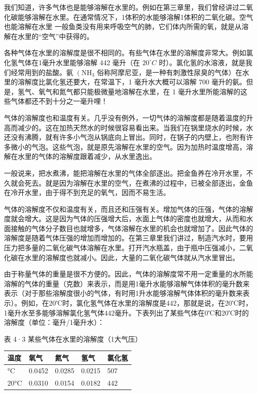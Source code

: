 我们知道，许多气体也是能够溶解在水里的。例如在第三章里，我们曾经讲过二氧化碳能够溶解在水里。在通常情况下，1体积的水能够溶解1体积的二氧化碳。空气也能溶解在水里
一般鱼类没有用来呼吸空气的肺，它们体内所需的氧，就是从溶解在水里的``空气''中获得的。

各种气体在水里的溶解度是很不相同的。有些气体在水里的溶解度非常大。例如氯化氢气体在1毫升水里能够溶解
442 毫升（在 \(20^{\circ}C\)
时）。氯化氢的水溶液，就是我们经常用到的盐酸。氨
\(\left(\mathrm{NH}_{3}\right.\)
俗称阿摩尼亚，是一种有刺激性尿臭的气体）在水里的溶解度比氯化氢还要大，在常温下，1
毫升水大概可以溶解 700
毫升的氨。但是，氢气、氧气和氮气都只能极微量地溶解在水里，在 1
毫升水里所能溶解的这些气体都还不到十分之一毫升哩！

气体的溶解度也和温度有关。几乎没有例外，一切气体的溶解度都是随着温度的升高而减少的。这在加热天然水的时候很容易看出来。当我们在锅里烧水的时候，水还没有沸腾，就有许多小气泡从锅底向上冒出。同时，在锅子的内壁上，也附有许多微小的气泡。这些气泡，就是原先溶解在水里的空气。因为加热时温度增高，溶解在水里的气体的溶解度跟着减少，从水里逸出。

一般说来，把水煮沸，能把溶解在水里的气体全部逐出。把金鱼养在冷开水里，不久就会死去。就是因为溶解在水里的空气，在煮沸的过程中，已被全部逐出，金鱼在冷开水里，由于得不到充足的氧气，因而不易生活。

气体的溶解度不仅和温度有关，而且还和压强有关。增加气体的压强，气体的溶解度就会增大。这是因为气体的压强增大后，水面上气体的密度也就增大，从而和水面接触的气体分子数目也就增多，气体溶解在水里的机会也就增加了。因此气体的溶解度是随着气体压强的增加而增加的。在第三章里我们讲过，制造汽水时，要用压力把多量的二氧化碳气体溶解在水里。打开汽水瓶盖，由于瓶中压强减小，二氧化碳在水里的溶解度也就减小。因此，大量的二氧化碳气体就从汽水里冒出。

由于称量气体的重量是很不方便的。因此，气体的溶解度常不用一定重量的水所能溶解的气体的重量（克数）来表示，而是用1毫升水能够溶解气体体积的毫升数来表示（对于那些溶解度很小的气体，有时用1升水能够溶解气体体积的毫升数来表示）。例如，在20℃时，氯化氢气体在水里的溶解度是442，那就是说，在20℃时，1毫升水至多能够溶解氯化氢气体442毫升。下表列出了某些气体在0℃和20℃时的溶解度（单位：毫升/1毫升水）：

表 4·3 某些气体在水里的溶解度（1大气压）

{\def\LTcaptype{none} %
\begin{longtable}[]{@{}lllll@{}}
\toprule\noalign{}
温度 & 氧气 & 氮气 & 氢气 & 氯化氢 \\
\midrule\noalign{}
\endhead
\bottomrule\noalign{}
\endlastfoot
0°C & 0.0452 & 0.0285 & 0.0215 & 507 \\
20°C & 0.0310 & 0.0154 & 0.0182 & 442 \\
\end{longtable}
}

